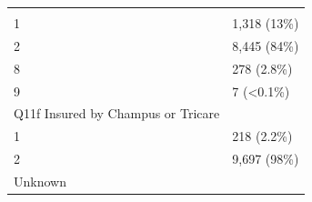 \documentclass[]{article}
\begin{document}
\begin{longtable}[]{@{}ll@{}}
\begin{minipage}[t]{0.23\columnwidth}
\strut
\end{minipage}\tabularnewline
\begin{minipage}[t]{0.71\columnwidth}\raggedright
1\strut
\end{minipage} & \begin{minipage}[t]{0.23\columnwidth}\raggedright
1,318 (13\%)\strut
\end{minipage}\tabularnewline
\begin{minipage}[t]{0.71\columnwidth}\raggedright
2\strut
\end{minipage} & \begin{minipage}[t]{0.23\columnwidth}\raggedright
8,445 (84\%)\strut
\end{minipage}\tabularnewline
\begin{minipage}[t]{0.71\columnwidth}\raggedright
8\strut
\end{minipage} & \begin{minipage}[t]{0.23\columnwidth}\raggedright
278 (2.8\%)\strut
\end{minipage}\tabularnewline
\begin{minipage}[t]{0.71\columnwidth}\raggedright
9\strut
\end{minipage} & \begin{minipage}[t]{0.23\columnwidth}\raggedright
7 (\textless{}0.1\%)\strut
\end{minipage}\tabularnewline
\begin{minipage}[t]{0.71\columnwidth}\raggedright
Q11f Insured by Champus or Tricare\strut
\end{minipage} & \begin{minipage}[t]{0.23\columnwidth}\raggedright
\strut
\end{minipage}\tabularnewline
\begin{minipage}[t]{0.71\columnwidth}\raggedright
1\strut
\end{minipage} & \begin{minipage}[t]{0.23\columnwidth}\raggedright
218 (2.2\%)\strut
\end{minipage}\tabularnewline
\begin{minipage}[t]{0.71\columnwidth}\raggedright
2\strut
\end{minipage} & \begin{minipage}[t]{0.23\columnwidth}\raggedright
9,697 (98\%)\strut
\end{minipage}\tabularnewline
\begin{minipage}[t]{0.71\columnwidth}\raggedright
Unknown\strut
\end{minipage} & \begin{minipage}[t]{0.23\columnwidth}\raggedright

\end{minipage}
\end{longtable}
\end{document}
